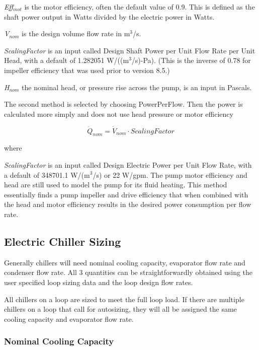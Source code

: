 \emph{Eff\(_{mot}\)} is the motor efficiency, often the default value of 0.9. This is defined as the shaft power output in Watts divided by the electric power in Watts.

\emph{V\(_{nom}\)} is the design volume flow rate in m\(^{3}\)/s.

\emph{ScalingFactor} is an input called Design Shaft Power per Unit Flow Rate per Unit Head, with a default of 1.282051 W/((m\(^{3}\)/s)-Pa). (This is the inverse of 0.78 for impeller efficiency that was used prior to version 8.5.)

\emph{H\(_{nom}\)} the nominal head, or pressure rise across the pump, is an input in Pascals.

The second method is selected by choosing PowerPerFlow. Then the power is calculated more simply and does not use head pressure or motor efficiency

\begin{equation}
\dot Q_{nom} = \dot V_{nom} \cdot ScalingFactor
\end{equation}

where

\emph{ScalingFactor} is an input called Design Electric Power per Unit Flow Rate, with a default of 348701.1 W/(m\(^{3}\)/s) or 22 W/gpm. The pump motor efficiency and head are still used to model the pump for its fluid heating. This method essentially finds a pump impeller and drive efficiency that when combined with the head and motor efficiency results in the desired power consumption per flow rate.

\subsection{Electric Chiller Sizing}\label{electric-chiller-sizing}

Generally chillers will need nominal cooling capacity, evaporator flow rate and condenser flow rate. All 3 quantities can be straightforwardly obtained using the user specified loop sizing data and the loop design flow rates.

All chillers on a loop are sized to meet the full loop load. If there are multiple chillers on a loop that call for autosizing, they will all be assigned the same cooling capacity and evaporator flow rate.

\subsubsection{Nominal Cooling Capacity}\label{nominal-cooling-capacity}

